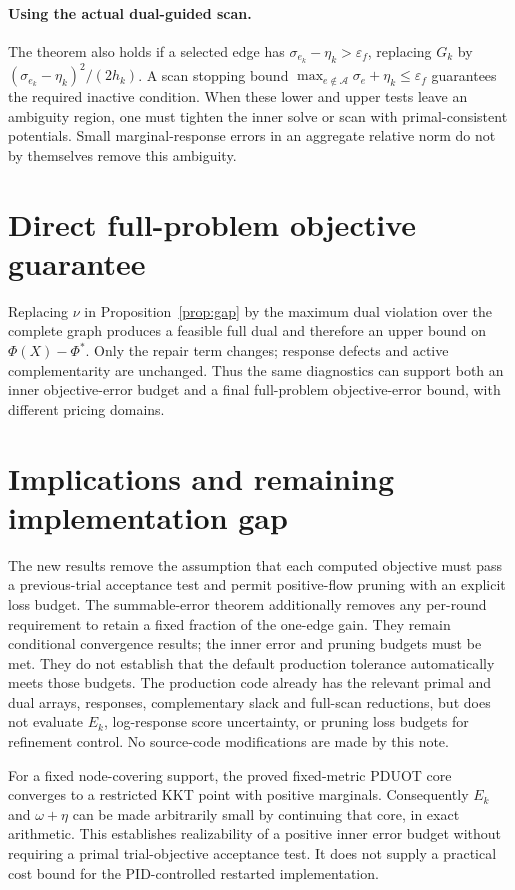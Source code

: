 \documentclass[11pt]{article}
\begin{document}
\paragraph{Using the actual dual-guided scan.}
The theorem also holds if a selected edge has $\sigma_{e_k}-\eta_k>\varepsilon_f$, replacing $G_k$ by $(\sigma_{e_k}-\eta_k)^2/(2h_k)$.
A scan stopping bound $\max_{e\notin\mathcal A}\sigma_e+\eta_k\leq\varepsilon_f$ guarantees the required inactive condition.
When these lower and upper tests leave an ambiguity region, one must tighten the inner solve or scan with primal-consistent potentials.
Small marginal-response errors in an aggregate relative norm do not by themselves remove this ambiguity.

\section{Direct full-problem objective guarantee}
Replacing $\nu$ in Proposition~\ref{prop:gap} by the maximum dual violation over the complete graph produces a feasible full dual and therefore an upper bound on $\Phi(X)-\Phi^*$.
Only the repair term changes; response defects and active complementarity are unchanged.
Thus the same diagnostics can support both an inner objective-error budget and a final full-problem objective-error bound, with different pricing domains.

\section{Implications and remaining implementation gap}
The new results remove the assumption that each computed objective must pass a previous-trial acceptance test and permit positive-flow pruning with an explicit loss budget.
The summable-error theorem additionally removes any per-round requirement to retain a fixed fraction of the one-edge gain.
They remain conditional convergence results; the inner error and pruning budgets must be met.
They do not establish that the default production tolerance automatically meets those budgets.
The production code already has the relevant primal and dual arrays, responses, complementary slack and full-scan reductions, but does not evaluate $E_k$, log-response score uncertainty, or pruning loss budgets for refinement control.
No source-code modifications are made by this note.

For a fixed node-covering support, the proved fixed-metric PDUOT core converges to a restricted KKT point with positive marginals.
Consequently $E_k$ and $\omega+\eta$ can be made arbitrarily small by continuing that core, in exact arithmetic.
This establishes realizability of a positive inner error budget without requiring a primal trial-objective acceptance test.
It does not supply a practical cost bound for the PID-controlled restarted implementation.
\end{document}
